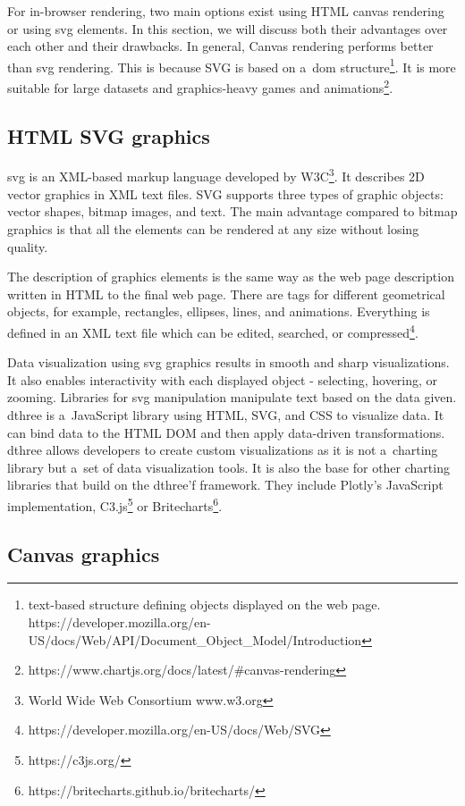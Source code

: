 For in-browser rendering, two main options exist using HTML canvas rendering or using \ac{svg} elements. In this section, we will discuss both their advantages over each other and their drawbacks. In general, Canvas rendering performs better than \ac{svg} rendering. This is because SVG is based on a~\ac{dom} structure\footnote{text-based structure defining objects displayed on the web page. https://developer.mozilla.org/en-US/docs/Web/API/Document\_Object\_Model/Introduction}. It is more suitable for large datasets and graphics-heavy games and animations\footnote{https://www.chartjs.org/docs/latest/\#canvas-rendering}.

\subsection{HTML SVG graphics}

\ac{svg} is an XML-based markup language developed by W3C\footnote{World Wide Web Consortium www.w3.org}. It describes 2D vector graphics in XML text files. SVG supports three types of graphic objects: vector shapes, bitmap images, and text. The main advantage compared to bitmap graphics is that all the elements can be rendered at any size without losing quality. 

The description of graphics elements is the same way as the web page description written in HTML to the final web page. There are tags for different geometrical objects, for example, rectangles, ellipses, lines, and animations. Everything is defined in an XML text file which can be edited, searched, or compressed\footnote{https://developer.mozilla.org/en-US/docs/Web/SVG}.

Data visualization using \ac{svg} graphics results in smooth and sharp visualizations. It also enables interactivity with each displayed object - selecting, hovering, or zooming. Libraries for \ac{svg} manipulation manipulate text based on the data given. \ac{dthree} is a~JavaScript library using HTML, SVG, and CSS to visualize data. It can bind data to the HTML DOM and then apply data-driven transformations. \ac{dthree} allows developers to create custom visualizations as it is not a~charting library but a~set of data visualization tools. It is also the base for other charting libraries that build on the \ac{dthree}'f framework. They include Plotly's JavaScript implementation, C3.js\footnote{https://c3js.org/} or Britecharts\footnote{https://britecharts.github.io/britecharts/}.

\subsection{Canvas graphics}\label{txt.design.canvas}

